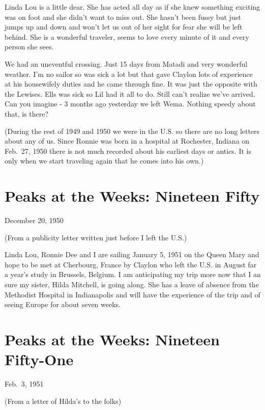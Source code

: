 \documentclass[]{book}
\begin{document}
Linda Lou is a little dear. She has acted all day as if she knew something exciting was on foot and she didn't want to miss out. She hasn't been fussy but just jumps up and down and won't let us out of her sight for fear she will be left behind. She is a wonderful traveler, seems to love every minute of it and every person she sees.

We had an uneventful crossing. Just 15 days from Matadi and very wonderful weather. I'm no sailor so was sick a lot but that gave Claylon lots of experience at his housewifely duties and he came through fine. It was just the opposite with the Lewises. Ells was sick so Lil had it all to do. Still can't realize we've arrived. Can you imagine - 3 months ago yesterday we left Wema. Nothing speedy about that, is there?

(During the rest of 1949 and 1950 we were in the U.S. so there are no long letters about any of us. Since Ronnie was born in a hospital at Rochester, Indiana on Feb.~27, 1950 there is not much recorded about his earliest days or antics. It is only when we start traveling again that he comes into his own.)

\hypertarget{peaks-at-the-weeks-nineteen-fifty}{%
\chapter{Peaks at the Weeks: Nineteen Fifty}\label{peaks-at-the-weeks-nineteen-fifty}}

December 20, 1950

(From a publicity letter written just before I left the U.S.)

Linda Lou, Ronnie Dee and I are sailing January 5, 1951 on the Queen Mary and hope to be met at Cherbourg, France by Claylon who left the U.S. in August far a year's study in Brussels, Belgium. I am anticipating my trip more now that I an sure my sister, Hilda Mitchell, is going along. She has a leave of absence from the Methodist Hospital in Indianapolis and will have the experience of the trip and of seeing Europe for about seven weeks.

\hypertarget{peaks-at-the-weeks-nineteen-fifty-one}{%
\chapter{Peaks at the Weeks: Nineteen Fifty-One}\label{peaks-at-the-weeks-nineteen-fifty-one}}

Feb.~3, 1951

(From a letter of Hilda's to the folks)
\end{document}
